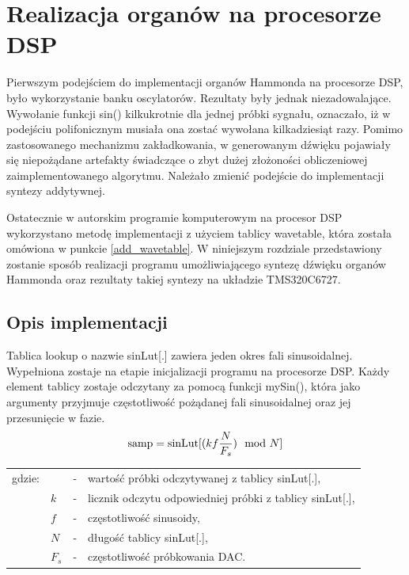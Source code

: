 \section{Realizacja organów na procesorze DSP}
Pierwszym podejściem do implementacji organów Hammonda na procesorze DSP, było wykorzystanie banku oscylatorów. Rezultaty były jednak niezadowalające. Wywołanie funkcji sin() kilkukrotnie dla jednej próbki sygnału, oznaczało, iż w podejściu polifonicznym musiała ona zostać wywołana kilkadziesiąt razy.
Pomimo zastosowanego mechanizmu zakładkowania, w generowanym dźwięku pojawiały się niepożądane artefakty świadczące o zbyt dużej złożoności obliczeniowej zaimplementowanego algorytmu. Należało zmienić podejście do implementacji syntezy addytywnej.

Ostatecznie w autorskim programie komputerowym na procesor DSP wykorzystano metodę implementacji z użyciem tablicy wavetable, która została omówiona w punkcie \ref{add_wavetable}. W niniejszym rozdziale przedstawiony zostanie sposób realizacji programu umożliwiającego syntezę dźwięku organów Hammonda oraz rezultaty takiej syntezy na układzie TMS320C6727.

\subsection{Opis implementacji}
Tablica lookup o nazwie sinLut[.] zawiera jeden okres fali sinusoidalnej. Wypełniona zostaje na etapie inicjalizacji programu na procesorze DSP. Każdy element tablicy zostaje odczytany za pomocą funkcji mySin(), która jako argumenty przyjmuje częstotliwość pożądanej fali sinusoidalnej oraz jej przesunięcie w fazie.
\begin{equation} \label{equ:addit_sinLut}
\text{samp} = \text{sinLut}[(kf\frac{N}{F_s})\mod{N}] \\  
\end{equation}
\begin{tabular}{ l l l l}
	gdzie: & \text{samp} &  - & wartość próbki odczytywanej z tablicy sinLut[.], \\
	& $k$ &  - & licznik odczytu odpowiedniej próbki z tablicy sinLut[.], \\
	& $f$ & - & częstotliwość sinusoidy, \\
	& $N$ & - & długość tablicy sinLut[.], \\
	& $F_s$ & - & częstotliwość próbkowania DAC. \\
\end{tabular} \\


